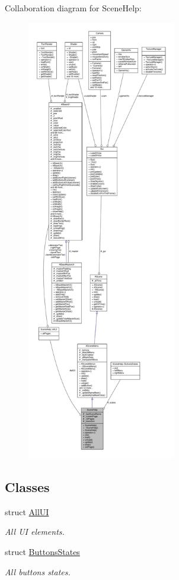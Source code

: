 Collaboration diagram for Scene\+Help\+:
\nopagebreak
\begin{figure}[H]
\begin{center}
\leavevmode
\includegraphics[height=550pt]{class_scene_help__coll__graph}
\end{center}
\end{figure}
\subsection*{Classes}
\begin{DoxyCompactItemize}
\item 
struct \hyperlink{struct_scene_help_1_1_all_u_i}{All\+UI}
\begin{DoxyCompactList}\small\item\em All UI elements. \end{DoxyCompactList}\item 
struct \hyperlink{struct_scene_help_1_1_buttons_states}{Buttons\+States}
\begin{DoxyCompactList}\small\item\em All buttons states. \end{DoxyCompactList}\end{DoxyCompactItemize}
